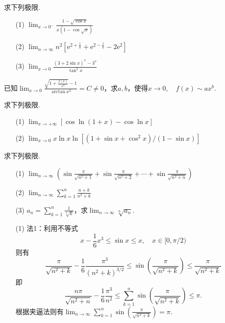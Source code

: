 \begin{xiti}
\begin{solution}
\end{solution}
\item 求下列极限.
\begin{enumerate}
	\item[(1)] $\lim _ { x \rightarrow 0 ^ { - } } \frac { 1 - \sqrt { \cos x } } { x ( 1 - \cos \sqrt { x } ) }$
	\item[(2)] $\lim _ { n \rightarrow \infty } n ^ { 2 } \left[ \mathrm { e } ^ { 2 + \frac { 1 } { n } } + \mathrm { e } ^ { 2 - \frac { 1 } { n } } - 2 \mathrm { e } ^ { 2 } \right]$
	\item[(3)] $\lim _ { x \rightarrow 0 } \frac { ( 3 + 2 \sin x ) ^ { x } - 3 ^ { x } } { \tan ^ { 2 } x }$
\end{enumerate}
\item 已知$\lim _ { x \rightarrow 0 } \frac { \sqrt { 1 + \frac { f ( x ) } { x ^ { 2 } } } - 1 } { \arctan x ^ { 2 } } = C \neq 0$，求$a,b$，使得$x \rightarrow 0 , \quad f ( x ) \sim a x ^ { b }$.
\item 求下列极限.
\begin{enumerate}
	\item[(1)] $\lim _ { x \rightarrow + \infty } [ \cos \ln ( 1 + x ) - \cos \ln x ]$
	\item[(2)] $\lim _ { x \rightarrow 0 } x \ln x \ln \left[ \left( 1 + \sin x + \cos ^ { 2 } x \right) / ( 1 - \sin x ) \right]$
\end{enumerate}
\item 求下列极限.
\begin{enumerate}
	\item[(1)] $\lim _ { n \rightarrow \infty } \left( \sin \frac { \pi } { \sqrt { n ^ { 2 } + 1 } } + \sin \frac { \pi } { \sqrt { n ^ { 2 } + 2 } } + \cdots + \sin \frac { \pi } { \sqrt { n ^ { 2 } + n } } \right)$
	\item[(2)] $\lim _ { n \rightarrow \infty } \sum _ { k = 1 } ^ { n } \frac { n + k } { n ^ { 2 } + k }$
	\item[(3)] $a _ { n } = \sum _ { k = 1 } ^ { n } \frac { 1 } { \sqrt [ k ] { k } }$，求$\lim _ { n \rightarrow \infty } \sqrt [ n ] { a _ { n } }$.
\end{enumerate}
\begin{solution}
	\begin{enumerate}
		\item[(1)] 法1：利用不等式
		\[x-\frac{1}{6} x^{3} \leq \sin x \leq x, \quad x \in[0, \pi / 2)\]
		则有
		\[
		\frac{\pi}{\sqrt{n^{2}+k}}-\frac{1}{6} \frac{\pi^{3}}{\left(n^{2}+k\right)^{3 / 2}} \leq \sin \left(\frac{\pi}{\sqrt{n^{2}+k}}\right) \leq \frac{\pi}{\sqrt{n^{2}+k}}
		\]
		即
		\[\frac{n\pi}{\sqrt{n^2 + n}} - \frac{1}{6}\frac{\pi^3}{n^2} \leq \sum_{k = 1}^n\sin\left(\frac{\pi}{\sqrt{n^2 + k}}\right) \leq \pi.\]
		根据夹逼法则有$\lim_{n \to \infty} \sum_{k = 1}^n\sin\left(\frac{\pi}{\sqrt{n^2 + k}}\right) = \pi.$
		

\end{enumerate}
\end{solution}
\end{xiti}

